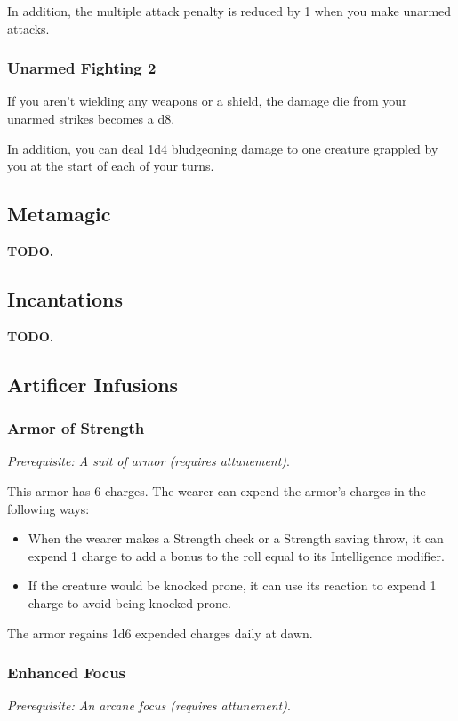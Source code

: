         In addition, the multiple attack penalty is reduced by 1 when you make unarmed attacks.
    \subsubsection{Unarmed Fighting 2}
        If you aren't wielding any weapons or a shield, the damage die from your unarmed strikes becomes a d8.

        In addition, you can deal 1d4 bludgeoning damage to one creature grappled by you at the start of each of your turns.

\subsection*{Metamagic} \label{ssec::metamagic}
    \textbf{TODO.} %

\subsection*{Incantations} \label{ssec::incantations}
    \textbf{TODO.} %

\subsection*{Artificer Infusions} \label{ssec::artificerinfusions}
    \subsubsection{Armor of Strength}
        \textit{Prerequisite: A suit of armor (requires attunement)}.

        This armor has 6 charges. The wearer can expend the armor's charges in the following ways:
        \begin{itemize}
            \item When the wearer makes a Strength check or a Strength saving throw, it can expend 1 charge to add a bonus to the roll equal to its Intelligence modifier.
            \item If the creature would be knocked prone, it can use its reaction to expend 1 charge to avoid being knocked prone.
        \end{itemize}
        The armor regains 1d6 expended charges daily at dawn.
    \subsubsection{Enhanced Focus}
        \textit{Prerequisite: An arcane focus (requires attunement)}.

